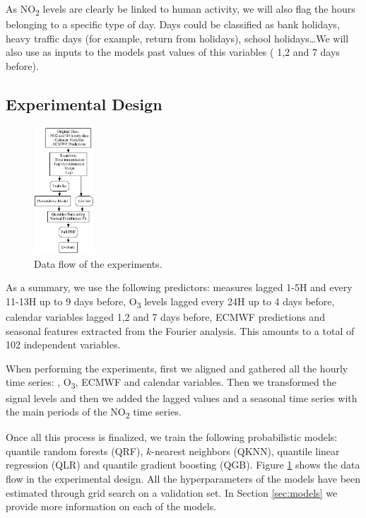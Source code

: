 \documentclass[a4paper,3p,sort&compress]{elsarticle}
\begin{document}
As NO\textsubscript{2} levels are clearly be linked to human activity,
we will also flag the hours belonging to a specific type of day. Days
could be classified as bank holidays, heavy traffic days (for example,
return from holidays), school holidays\ldots We will also use as
inputs to the models past values of this variables ( 1,2 and 7 days
before). 

\subsection{Experimental Design}
\label{sec:experimental-design}

\begin{figure}
  \centering
  \includegraphics[width=0.2\textwidth]{diagrams/flow}
  \caption{\label{figure:dataflow}Data flow of the
    experiments.}
\end{figure}

As a summary, we use the following predictors: \no
measures lagged 1-5H and every 11-13H up to 9 days before,
O\textsubscript{3} levels lagged every 24H up to 4 days before, 
calendar variables lagged 1,2 and 7 days before,
 ECMWF predictions and seasonal features extracted
from the Fourier analysis. This amounts to a total of 102 independent
variables. 

When performing the experiments, first we aligned and gathered all the
hourly time series: \no, O\textsubscript{3}, ECMWF and
calendar variables.  Then we transformed the signal levels and then we
added the lagged values and a seasonal time series with the main
periods of the NO\textsubscript{2} time series.

Once all this process is finalized, we train the following
probabilistic models: quantile random forests (QRF), $k$-nearest
neighbors (QKNN), quantile linear regression (QLR) and quantile
gradient boosting (QGB).  Figure \ref{figure:dataflow} shows the data
flow in the experimental design. All the hyperparameters of the models
have been estimated through grid search on a validation set.  
In Section \ref{sec:models}
we provide more information on each of the models.
\end{document}
